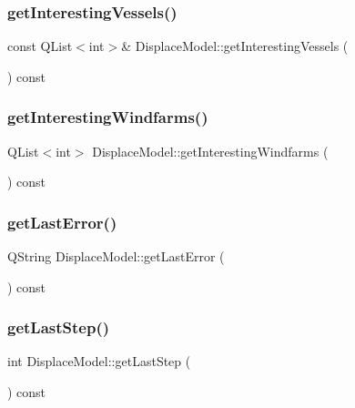 \subsubsection{\texorpdfstring{getInterestingVessels()}{getInterestingVessels()}}
{\footnotesize\ttfamily const Q\+List$<$int$>$\& Displace\+Model\+::get\+Interesting\+Vessels (\begin{DoxyParamCaption}{ }\end{DoxyParamCaption}) const\hspace{0.3cm}{\ttfamily [inline]}}

\mbox{\label{class_displace_model_a28ea3fda09973f64cbf3bd4a6e863976}} 
\subsubsection{\texorpdfstring{getInterestingWindfarms()}{getInterestingWindfarms()}}
{\footnotesize\ttfamily Q\+List$<$int$>$ Displace\+Model\+::get\+Interesting\+Windfarms (\begin{DoxyParamCaption}{ }\end{DoxyParamCaption}) const\hspace{0.3cm}{\ttfamily [inline]}}

\mbox{\label{class_displace_model_a7969c86416964f1da12913a0d6e269ef}} 
\subsubsection{\texorpdfstring{getLastError()}{getLastError()}}
{\footnotesize\ttfamily Q\+String Displace\+Model\+::get\+Last\+Error (\begin{DoxyParamCaption}{ }\end{DoxyParamCaption}) const\hspace{0.3cm}{\ttfamily [inline]}}

\mbox{\label{class_displace_model_a9ebadd447909bf6445c509fd9769934f}} 
\subsubsection{\texorpdfstring{getLastStep()}{getLastStep()}}
{\footnotesize\ttfamily int Displace\+Model\+::get\+Last\+Step (\begin{DoxyParamCaption}{ }\end{DoxyParamCaption}) const\hspace{0.3cm}{\ttfamily [inline]}}

